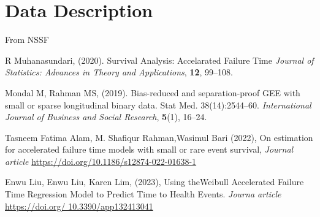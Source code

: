 \documentclass[twoside,a4paper,12pt]{article}
\begin{document}
 

\section*{Data Description}
From NSSF
\begin{thebibliography}{9}

R Muhanasundari, (2020). Survival Analysis: Accelarated Failure Time
\textit{Journal of Statistics: Advances in Theory and Applications}, \textbf{12}, 99--108.


Mondal M, Rahman MS, (2019). Bias-reduced and separation-proof GEE with small or sparse longitudinal binary data. Stat Med.  38(14):2544–60.
\textit{International Journal of Business and Social Research}, \textbf{5}(1), 16--24.

Tasneem Fatima Alam, M. Shafiqur Rahman,Wasimul Bari (2022), On estimation for accelerated failure
time models with small or rare event survival, \textit{Journal article} \newblock\href{https://doi.org/10.1186/s12874-022-01638-1}{https://doi.org/10.1186/s12874-022-01638-1}

 
 Enwu Liu, Enwu Liu, Karen Lim, (2023), Using theWeibull Accelerated
Failure Time Regression Model to
Predict Time to Health Events. \textit{Journa article}
\newblock\href{https://doi.org/
10.3390/app132413041}{https://doi.org/
10.3390/app132413041}


\end{thebibliography}
\end{document}
